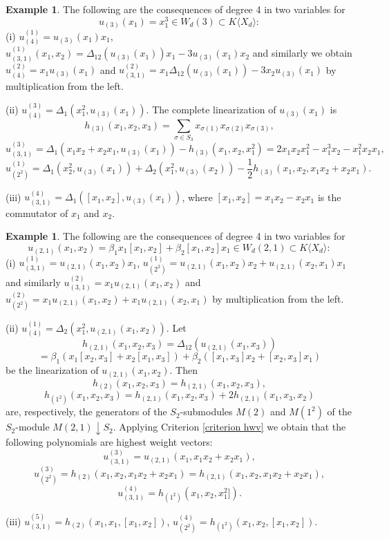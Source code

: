 \documentclass{amsart}
\theoremstyle{definition}
\newtheorem{example}[theorem]{Example}
\begin{document}
\begin{example}\label{consequences of M(3) in associative case}
The following are the consequences of degree 4 in two variables for
\[
u_{(3)}(x_1)=x_1^3\in W_d(3)\subset K\langle X_d\rangle:
\]
(i) $u^{(1)}_{(4)}=u_{(3)}(x_1)x_1$, $u^{(1)}_{(3,1)}(x_1,x_2)=\Delta_{12}(u_{(3)}(x_1))x_1-3u_{(3)}(x_1)x_2$
and similarly we obtain $u^{(2)}_{(4)}=x_1u_{(3)}(x_1)$ and $u^{(2)}_{(3,1)}=x_1\Delta_{12}(u_{(3)}(x_1))-3x_2u_{(3)}(x_1)$
by multiplication from the left.

(ii) $u^{(3)}_{(4)}=\Delta_1(x_1^2,u_{(3)}(x_1))$. The complete linearization of $u_{(3)}(x_1)$ is
\[
h_{(3)}(x_1,x_2,x_3)=\sum_{\sigma\in S_3}x_{\sigma(1)}x_{\sigma(2)}x_{\sigma(3)},
\]
\[
u^{(3)}_{(3,1)}=\Delta_1(x_1x_2+x_2x_1,u_{(3)}(x_1))-h_{(3)}(x_1,x_2,x_1^2)=2x_1x_2x_1^2-x_1^3x_2-x_1^2x_2x_1,
\]
\[
u^{(1)}_{(2^2)}=\Delta_1(x_2^2,u_{(3)}(x_1))+\Delta_2(x_1^2,u_{(3)}(x_2))-\frac{1}{2}h_{(3)}(x_1,x_2,x_1x_2+x_2x_1).
\]

(iii) $u^{(4)}_{(3,1)}=\Delta_1([x_1,x_2],u_{(3)}(x_1))$, where $[x_1,x_2]=x_1x_2-x_2x_1$ is the commutator of $x_1$ and $x_2$.
\end{example}

\begin{example}\label{consequences of M(2,1) in associative case}
The following are the consequences of degree 4 in two variables for
\[
u_{(2,1)}(x_1,x_2)=\beta_1x_1[x_1,x_2]+\beta_2[x_1,x_2]x_1\in W_d(2,1)\subset K\langle X_d\rangle:
\]
(i) $u^{(1)}_{(3,1)}=u_{(2,1)}(x_1,x_2)x_1$, $u^{(1)}_{(2^2)}=u_{(2,1)}(x_1,x_2)x_2+u_{(2,1)}(x_2,x_1)x_1$
and similarly $u^{(2)}_{(3,1)}=x_1u_{(2,1)}(x_1,x_2)$ and $u^{(2)}_{(2^2)}=x_1u_{(2,1)}(x_1,x_2)+x_1u_{(2,1)}(x_2,x_1)$ by multiplication from the left.

(ii) $u^{(1)}_{(4)}=\Delta_2(x_1^2,u_{(2,1)}(x_1,x_2))$. Let
\[
h_{(2,1)}(x_1,x_2,x_3)=\Delta_{12}(u_{(2,1)}(x_1,x_3))
\]
\[
=\beta_1(x_1[x_2,x_3]+x_2[x_1,x_3])+\beta_2([x_1,x_3]x_2+[x_2,x_3]x_1)
\]
be the linearization of $u_{(2,1)}(x_1,x_2)$. Then
\[
h_{(2)}(x_1,x_2,x_3)=h_{(2,1)}(x_1,x_2,x_3),
\]
\[
h_{(1^2)}(x_1,x_2,x_3)=h_{(2,1)}(x_1,x_2,x_3)+2h_{(2,1)}(x_1,x_3,x_2)
\]
are, respectively, the generators of the $S_2$-submodules $M(2)$ and $M(1^2)$ of the $S_2$-module $M(2,1)\downarrow S_2$.
Applying Criterion \ref{criterion hwv} we obtain that the following polynomials are highest weight vectors:
\[
u^{(3)}_{(3,1)}=u_{(2,1)}(x_1,x_1x_2+x_2x_1),
\]
\[
u^{(3)}_{(2^2)}=h_{(2)}(x_1,x_2,x_1x_2+x_2x_1)=h_{(2,1)}(x_1,x_2,x_1x_2+x_2x_1),
\]
\[
u^{(4)}_{(3,1)}=h_{(1^2)}(x_1,x_2,x_1^2]).
\]

(iii) $u^{(5)}_{(3,1)}=h_{(2)}(x_1,x_1,[x_1,x_2])$, $u^{(4)}_{(2^2)}=h_{(1^2)}(x_1,x_2,[x_1,x_2])$.
\end{example}
\end{document}
